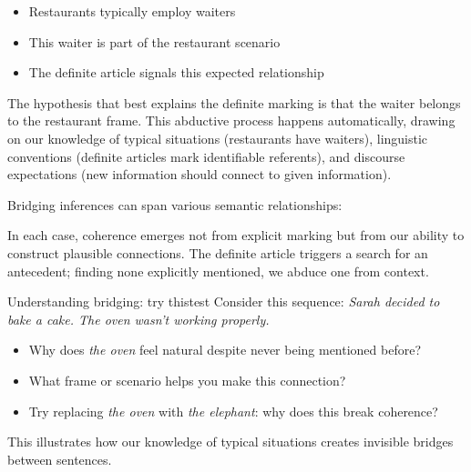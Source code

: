 \begin{itemize}[noitemsep]
   \item Restaurants typically employ waiters
   \item This waiter is part of the restaurant scenario
   \item The definite article signals this expected relationship
\end{itemize}

The hypothesis that best explains the definite marking is that the waiter belongs to the restaurant frame. This abductive process happens automatically, drawing on our knowledge of typical situations (restaurants have waiters), linguistic conventions (definite articles mark identifiable referents), and discourse expectations (new information should connect to given information).

Bridging inferences can span various semantic relationships:

\ea
   \z
\z
In each case, coherence emerges not from explicit marking but from our ability to construct plausible connections. The definite article triggers a search for an antecedent; finding none explicitly mentioned, we abduce one from context.

\begin{tblsframedsymbol}{Understanding bridging: try this}{test}
Consider this sequence: \emph{Sarah decided to bake a cake. The oven wasn't working properly.}
\begin{itemize}[noitemsep, leftmargin=*]
    \item Why does \emph{the oven} feel natural despite never being mentioned before?
    \item What frame or scenario helps you make this connection?
    \item Try replacing \emph{the oven} with \emph{the elephant}: why does this break coherence?
\end{itemize}
This illustrates how our knowledge of typical situations creates invisible bridges between sentences.
\end{tblsframedsymbol}

